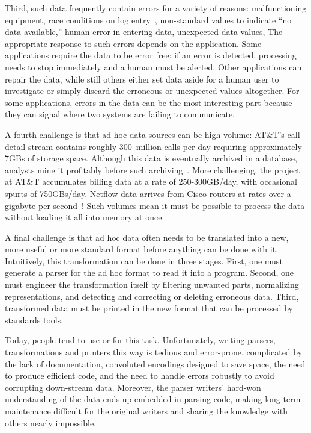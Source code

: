 \documentclass[11pt]{article}
\begin{document}
Third, such data frequently contain errors for a variety of reasons:
malfunctioning equipment, race conditions on log entry~\cite{wpp},
non-standard values to indicate ``no data available,'' human error in
entering data, unexpected data values, \etc{} The appropriate response
to such errors depends on the application.  Some applications require
the data to be error free: if an error is detected, processing needs
to stop immediately and a human must be alerted.  Other applications
can repair the data, while still others either set data aside for
a human user to investigate or simply discard the erroneous
or unexpected values altogether.  For some applications, errors in the data can
be the most interesting part because they can signal where two systems
are failing to communicate.

A fourth challenge is that ad hoc data sources can be high volume:
AT\&T's call-detail stream contains roughly 300~million calls per day
requiring approximately 7GBs of storage space. Although this data is
eventually archived in a database, analysts mine it profitably before
such archiving~\cite{kdd98,kdd99}. More challenging, the \ningaui{}
project at AT\&T accumulates billing data at a rate of 250-300GB/day,
with occasional spurts of 750GBs/day. Netflow data arrives from Cisco
routers at rates over a gigabyte per second~\cite{gigascope}! Such
volumes mean it must be possible to process the data without loading
it all into memory at once.

A final challenge is that ad hoc data often needs to be translated
into a new, more useful or more standard format before anything
can be done with it.  Intuitively, this transformation
can be done in three stages.  First, one must generate a parser for
the ad hoc format to read it into a program.  Second,
one must engineer the transformation itself by
filtering unwanted parts, normalizing representations, and
detecting and correcting or deleting erroneous data.  Third,
transformed data must be printed in the new format that can be processed by
standards tools.

Today, people tend to use \C{} or \perl{} for this task.
Unfortunately, writing parsers, transformations and printers this way
is tedious and error-prone, complicated by the lack of documentation,
convoluted encodings designed to save space, the need to produce
efficient code, and the need to handle errors robustly to avoid
corrupting down-stream data.  Moreover, the parser writers' hard-won
understanding of the data ends up embedded in parsing code, making
long-term maintenance difficult for the original writers and sharing
the knowledge with others nearly impossible.
\end{document}
